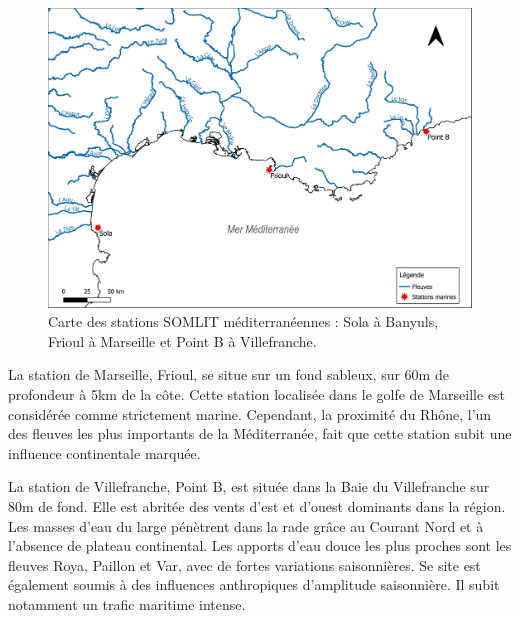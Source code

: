 \documentclass[12pt]{article}
\begin{document}
\begin{figure}
\centering
\includegraphics[width=.7\textwidth]{fig/MM_map.pdf}
\caption{Carte des stations SOMLIT méditerranéennes : Sola à Banyuls, Frioul à Marseille et Point B à Villefranche.}
\label{map}
\end{figure}

La station de Marseille, Frioul, se situe sur un fond sableux, sur 60m de profondeur à 5km de la côte. Cette station localisée dans le golfe de Marseille est considérée comme strictement marine. Cependant, la proximité du Rhône, l’un des fleuves les plus importants de la Méditerranée, fait que cette station subit une influence continentale marquée. 

La station de Villefranche, Point B, est située dans la Baie du Villefranche sur 80m de fond. Elle est abritée des vents d’est et d’ouest dominants dans la région. Les masses d’eau du large pénètrent dans la rade grâce au Courant Nord et à l’absence de plateau continental. Les apports d’eau douce les plus proches sont les fleuves Roya, Paillon et Var, avec de fortes variations saisonnières. Se site est également soumis à des influences anthropiques d’amplitude saisonnière. Il subit notamment un trafic maritime intense. 

\end{document}
